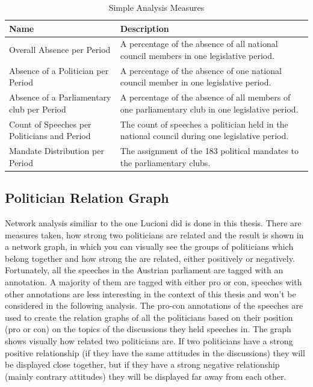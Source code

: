 \begin{table}[h]

\bgroup
\def\arraystretch{1.2}
\begin{tabular}{| p{5cm} | p{8cm} |}
\hline
  Name & Description \\
\hline
\hline
  Overall Absence per Period & A percentage of the absence of all national council members in one legislative period. \\
\hline
Absence of a Politician per Period & A percentage of the absence of one national council member in one legislative period. \\
\hline
Absence of a Parliamentary club per Period & A percentage of the absence of all members of one parliamentary club in one legislative period. \\
\hline
Count of Speeches per Politicians and Period & The count of speeches a politician held in the national council during one legislative period. \\
\hline
Mandate Distribution per Period & The assignment of the 183 political mandates to the parliamentary clubs. \\
\hline

\end{tabular}
\egroup

\caption{Simple Analysis Measures}
\label{table:simple_analysis}
\end{table}

\subsection{Politician Relation Graph}
\label{sec:pol_relation_graph}
Network analysis similiar to the one Lucioni \cite{Lucioni_2015} did is done in this thesis. There are measures taken, how strong two politicians are related and the result is shown in a network graph, in which you can visually see the groups of politicians which belong together and how strong the are related, either positively or negatively. Fortunately, all the speeches in the Austrian parliament are tagged with an annotation. A majority of them are tagged with either pro or con, speeches with other annotations are less interesting in the context of this thesis and won't be considered in the following analysis. The pro-con annotations of the speeches are used to create the relation graphs of all the politicians based on their position (pro or con) on the topics of the discussions they held speeches in. The graph shows visually how related two politicians are. If two politicians have a strong positive relationship (if they have the same attitudes in the discussions) they will be displayed close together, but if they have a strong negative relationship (mainly contrary attitudes) they will be displayed far away from each other.

